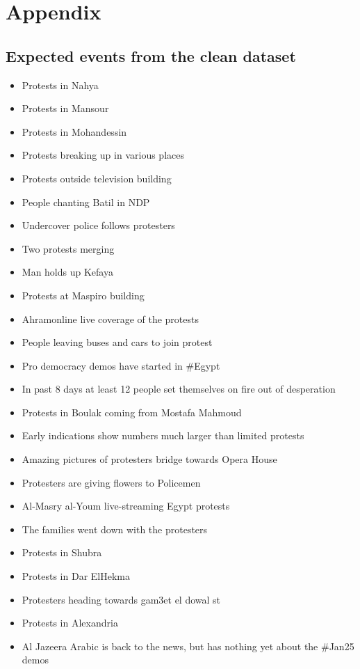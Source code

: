 \chapter{Appendix}\label{Appendix}

\section{Expected events from the clean dataset}\label{EventList}

\begin{itemize}
 \item Protests in Nahya
 \item Protests in Mansour
 \item Protests in Mohandessin 
 \item Protests breaking up in various places
 \item Protests outside television building
 \item People chanting Batil in NDP
 \item Undercover police follows protesters
 \item Two protests merging
 \item Man holds up Kefaya 
 \item Protests at Maspiro building
 \item Ahramonline live coverage of the protests
 \item People leaving buses and cars to join protest
 \item Pro democracy demos have started in \#Egypt
 \item In past 8 days at least 12 people set themselves on fire out of desperation
 \item Protests in Boulak coming from Mostafa Mahmoud
 \item Early indications show numbers much larger than limited protests
 \item Amazing pictures of protesters bridge towards Opera House 
 \item Protesters are giving flowers to Policemen
 \item Al-Masry al-Youm live-streaming Egypt protests
 \item The families went down with the protesters
 \item Protests in Shubra
 \item Protests in Dar ElHekma
 \item Protesters heading towards gam3et el dowal st
 \item Protests in Alexandria 
 \item Al Jazeera Arabic is back to the news, but has nothing yet about the \#Jan25 demos

\end{itemize}
